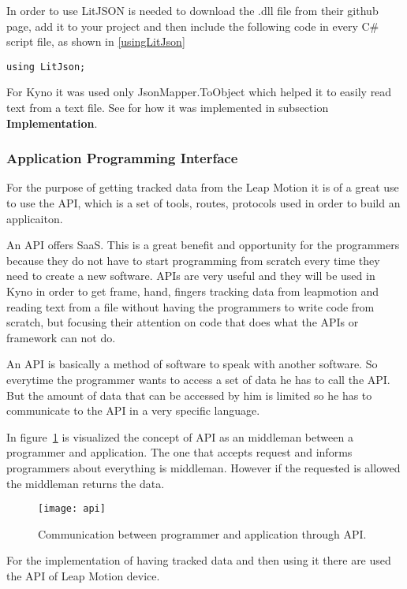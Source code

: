 {In order to use LitJSON is needed to download the .dll file from their github page, add it to your project and then include the following code in every C\# script file, as shown in  \autoref{usingLitJson}
\begin{lstlisting}[caption={Using LitJSON as a json reader for your project.},label={usingLitJson}]
using LitJson;
\end{lstlisting}


For Kyno it was used only JsonMapper.ToObject which helped it to easily read text from a text file. See for how it was implemented in subsection \textbf{Implementation}.

\subsubsection{Application Programming Interface}
For the purpose of getting tracked data from the Leap Motion it is of a great use to use the API, which is a set of tools, routes, protocols used in order to build an applicaiton.

An API offers SaaS. This is a great benefit and opportunity for the programmers because they do not have to start programming from scratch every time they need to create a new software. APIs are very useful and they will be used in Kyno in order to get frame, hand, fingers tracking data from leapmotion and reading text from a file without having the programmers to write code from scratch, but focusing their attention on code that does what the APIs or framework can not do. 

An API is basically a method of software to speak with another software. So everytime the programmer wants to access a set of data he has to call the API. But the amount of data that can be accessed by him is limited so he has to communicate to the API in a very specific language.

In \mbox{figure \ref{api}} is visualized the concept of API as an middleman between a programmer and application. The one that accepts request and informs programmers about everything is middleman. However if the requested is allowed the middleman returns the data.
\begin{figure}[!h]
\centering
\texttt{[image: api]}
\caption{Communication between programmer and application through API. \cite{api}}\label{api}
\end{figure}

For the implementation of having tracked data and then using it there are used the API of Leap Motion device.

}
